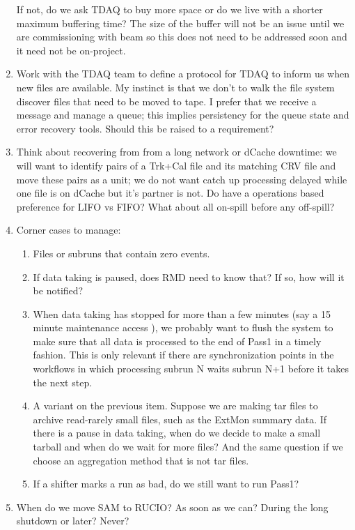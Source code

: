 \begin{enumerate}
  If not, do we ask TDAQ to buy more space or do we live with a shorter maximum buffering time?
  The size of the buffer will not be an issue until we are commissioning with beam so this does not need to
  be addressed soon and it need not be on-project.
\item Work with the TDAQ team to define a protocol for TDAQ to inform us when new files are available.
  My instinct is that we don't to walk the file system discover files that need to be moved to tape.
  I prefer that we receive a message and manage a queue; this implies persistency for the queue state
  and error recovery tools.
  Should this be raised to a requirement?
\item
  Think about recovering from from a long network or dCache downtime:
  we will want to identify pairs of a Trk+Cal file and its matching CRV file and move these pairs as a unit;
  we do not want catch up processing delayed while one file is on dCache but it's partner is not.
  Do have a operations based preference for LIFO vs FIFO? What about all on-spill before any off-spill?
\item Corner cases to manage:
  \begin{enumerate}
    \item Files or subruns that contain zero events.
    \item If data taking is paused, does RMD need to know that?  If so, how will it be notified?
    \item When data taking has stopped for more than a few minutes (say a 15 minute maintenance access ),
      we probably want to flush the system to make sure that all data is processed to the end of Pass1
      in a timely fashion.
      This is only relevant if there are synchronization points in the workflows in which processing
      subrun N waits subrun N+1 before it takes the next step.
    \item A variant on the previous item.  Suppose we are making tar files to archive read-rarely small
      files, such as the ExtMon summary data.
      If there is a pause in data taking, when do we decide to make a small tarball and when
      do we wait for more files?  And the same question if we choose an aggregation method that is not
      tar files.
    \item If a shifter marks a run as bad, do we still want to run Pass1?
  \end{enumerate}
\item   When do we move SAM to RUCIO? As soon as we can? During the long shutdown or later?  Never?

\end{enumerate}
